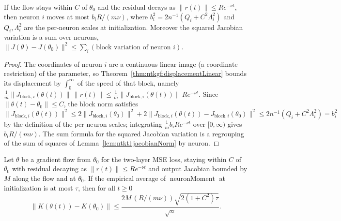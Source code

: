 \begin{theorem}\label{thm:ntktl:neuronDisplacement}
  \leanok
If the flow stays within $C$ of $\theta_0$ and the residual decays as $\|r(t)\|\le Re^{-\nu t}$, then neuron $i$ moves at most $b_iR/(m\nu)$, where $b_i^2=2n^{-1}(Q_i+C^2\Lambda_i^2)$ and $Q_i,\Lambda_i^2$ are the per-neuron scales at initialization. Moreover the squared Jacobian variation is a sum over neurons,
$\|J(\theta)-J(\theta_0)\|^2\le\sum_i(\text{block variation of neuron }i)$.
\end{theorem}

\begin{proof}
  \leanok
The coordinates of neuron $i$ are a continuous linear image (a coordinate restriction) of the parameter, so Theorem~\ref{thm:ntkgf:displacementLinear} bounds its displacement by $\int_0^\infty$ of the speed of that block, namely $\frac1m\|J_{\text{block},i}(\theta(t))\|\,\|r(t)\|\le\frac1m\|J_{\text{block},i}(\theta(t))\|\,Re^{-\nu t}$.
Since $\|\theta(t)-\theta_0\|\le C$, the block norm satisfies $\|J_{\text{block},i}(\theta(t))\|^2\le2\|J_{\text{block},i}(\theta_0)\|^2+2\|J_{\text{block},i}(\theta(t))-J_{\text{block},i}(\theta_0)\|^2\le2n^{-1}(Q_i+C^2\Lambda_i^2)=b_i^2$ by the definition of the per-neuron scales; integrating $\frac1mb_iRe^{-\nu t}$ over $[0,\infty)$ gives $b_iR/(m\nu)$.
The sum formula for the squared Jacobian variation is a regrouping of the sum of squares of Lemma~\ref{lem:ntktl:jacobianNorm} by neuron.
\end{proof}

\begin{theorem}\label{thm:ntktl:driftRate}
  \leanok
Let $\theta$ be a gradient flow from $\theta_0$ for the two-layer MSE loss, staying within $C$ of $\theta_0$ with residual decaying as $\|r(t)\|\le Re^{-\nu t}$ and output Jacobian bounded by $M$ along the flow and at $\theta_0$. If the empirical average of $\operatorname{neuronMoment}$ at initialization is at most $\tau$, then for all $t\ge0$
\[
  \|K(\theta(t))-K(\theta_0)\|\le\frac{2M\,(R/(m\nu))\sqrt{2(1+C^2)\tau}}{\sqrt n}.
\]
\end{theorem}

